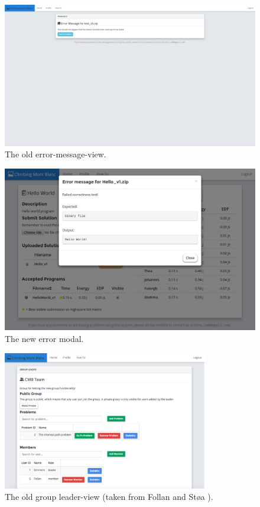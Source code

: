 \begin{figure}[h!]
    \centering
    \includegraphics[width=1.0\textwidth]{oldscreenshots/error.png}
    \caption[]{The old error-message-view.}
    \label{fig:apdx-old-error}
\end{figure}

\begin{figure}[h!]
    \centering
    \includegraphics[width=1.0\textwidth]{screenshots/error.jpg}
    \caption[]{The new error modal.}
    \label{fig:apdx-new-error}
\end{figure}

\begin{figure}[h!]
    \centering
    \includegraphics[width=0.8\textwidth]{oldscreenshots/leader.png}
    \caption[]{The old group leader-view (taken from Follan and Støa \cite{mt:T&S}).}
    \label{fig:apdx-old-leader}
\end{figure}

